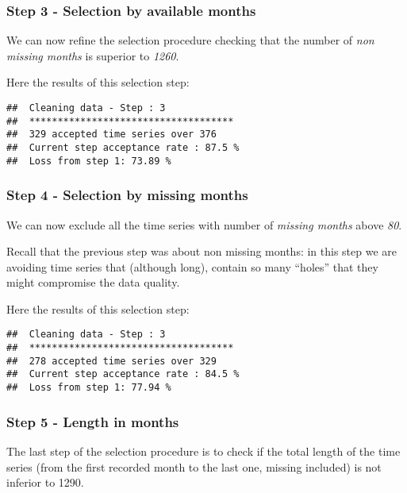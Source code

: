 \documentclass[]{article}
\begin{document}
\hypertarget{step-3---selection-by-available-months}{%
\subsubsection{Step 3 - Selection by available
months}\label{step-3---selection-by-available-months}}

We can now refine the selection procedure checking that the number of
\emph{non missing months} is superior to \emph{1260}.

Here the results of this selection step:

\begin{verbatim}
##  Cleaning data - Step : 3 
##  ************************************ 
##  329 accepted time series over 376 
##  Current step acceptance rate : 87.5 % 
##  Loss from step 1: 73.89 %
\end{verbatim}

\hypertarget{step-4---selection-by-missing-months}{%
\subsubsection{Step 4 - Selection by missing
months}\label{step-4---selection-by-missing-months}}

We can now exclude all the time series with number of \emph{missing
months} above \emph{80}.

Recall that the previous step was about non missing months: in this step
we are avoiding time series that (although long), contain so many
``holes'' that they might compromise the data quality.

Here the results of this selection step:

\begin{verbatim}
##  Cleaning data - Step : 3 
##  ************************************ 
##  278 accepted time series over 329 
##  Current step acceptance rate : 84.5 % 
##  Loss from step 1: 77.94 %
\end{verbatim}

\hypertarget{step-5---length-in-months}{%
\subsubsection{Step 5 - Length in
months}\label{step-5---length-in-months}}

The last step of the selection procedure is to check if the total length
of the time series (from the first recorded month to the last one,
missing included) is not inferior to 1290.
\end{document}
